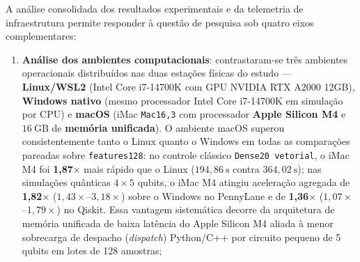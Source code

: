 \documentclass[
    12pt,
    openright,
    oneside,
    a4paper,
    english,
    brazil
]{abntex2}
\begin{document}
A análise consolidada dos resultados experimentais e da telemetria de infraestrutura permite responder à questão de pesquisa sob quatro eixos complementares:
\begin{enumerate}
    \item \textbf{Análise dos ambientes computacionais}: contrastaram-se três ambientes operacionais distribuídos nas duas estações físicas do estudo --- \textbf{Linux/WSL2} (Intel Core i7-14700K com GPU NVIDIA RTX A2000 12GB), \textbf{Windows nativo} (mesmo processador Intel Core i7-14700K em simulação por CPU) e \textbf{macOS} (iMac \texttt{Mac16,3} com processador \textbf{Apple Silicon M4} e \(16~\text{GB}\) de \textbf{memória unificada}). O ambiente macOS superou consistentemente tanto o Linux quanto o Windows em todas as comparações pareadas sobre \texttt{features128}: no controle clássico \texttt{Dense20 vetorial}, o iMac M4 foi \textbf{1,87\(\times\)} mais rápido que o Linux (\(194{,}86~\text{s}\) contra \(364{,}02~\text{s}\)); nas simulações quânticas \(4 \times 5\) qubits, o iMac M4 atingiu aceleração agregada de \textbf{1,82\(\times\)} (\(1{,}43\times\)--\(3{,}18\times\)) sobre o Windows no PennyLane e de \textbf{1,36\(\times\)} (\(1{,}07\times\)--\(1{,}79\times\)) no Qiskit. Essa vantagem sistemática decorre da arquitetura de memória unificada de baixa latência do Apple Silicon M4 aliada à menor sobrecarga de despacho (\textit{dispatch}) Python/C++ por circuito pequeno de 5 qubits em lotes de 128 amostras;

\end{enumerate}
\end{document}

